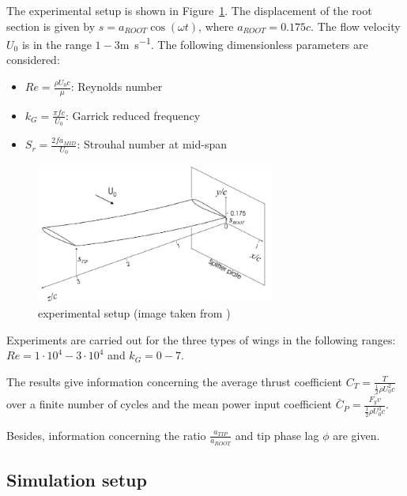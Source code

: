 The experimental setup is shown in Figure~\ref{fig:0012exp}. The displacement of the root section is given by $s = a_{ROOT} \cos(\omega t)$, where $a_{ROOT} = 0.175c$. The flow velocity $U_0$ is in the range $1-3$\si{m.s^{-1}}. The following dimensionless parameters are considered:

\begin{itemize}
	\item $Re = \frac{\rho U_0 c}{\mu}$: Reynolds number
	\item $k_G = \frac{\pi f c}{U_0}$: Garrick reduced frequency
	\item $S_r = \frac{2f a_{MID}}{U_0}$: Strouhal number at mid-span
\end{itemize}

\begin{figure}[htbp!]
	\centering
	\includegraphics[width=0.7\textwidth]{images/naca0012_exp}
	\caption{experimental setup (image taken from \cite{heathcote2008effect})}
	\label{fig:0012exp}
\end{figure}

Experiments are carried out for the three types of wings in the following ranges: $Re=1\cdot10^4-3\cdot10^4$ and $k_G=0-7$.

The results give information concerning the average thrust coefficient $C_T = \frac{T}{\frac{1}{2}\rho U_0^2c}$ over a finite number of cycles and the mean power input coefficient $\bar{C}_P = \frac{\bar{F_y v}}{\frac{1}{2}\rho U_0^3c}$.

Besides, information concerning the ratio $\frac{a_{TIP}}{a_{ROOT}}$ and tip phase lag $\phi$ are given.

\subsection{Simulation setup}







